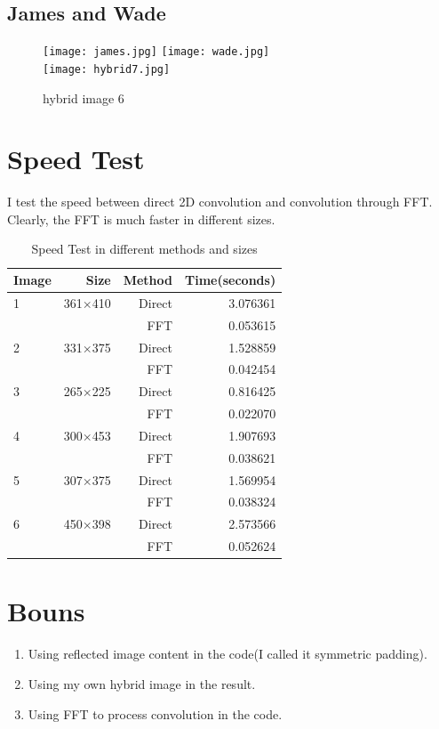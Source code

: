 \subsection{James and Wade}
\begin{figure}[h]
	\texttt{[image: james.jpg]}
	\texttt{[image: wade.jpg]}\\
	\texttt{[image: hybrid7.jpg]}
	\caption{hybrid image 6}
\end{figure}
\newpage
\section{Speed Test}
I test the speed between direct 2D convolution and convolution through FFT. Clearly, the FFT is much faster in different sizes.
\begin{table}[h]
    \centering
    \begin{tabular}{lrrr}
       	\hline
        Image 	&Size 	&Method &Time(seconds) \\
        \hline
        1 		& 361$\times$410 	&Direct	&3.076361\\
         		&  &FFT	&0.053615\\
       	\hline
       	2 		& 331$\times$375 	&Direct	&1.528859\\
       	&  &FFT	&0.042454\\
       	\hline
       	3 		& 265$\times$225 	&Direct	&0.816425\\
       	&  &FFT	&0.022070\\
       	\hline
       	4 		& 300$\times$453 	&Direct	&1.907693\\
       	&  &FFT	&0.038621\\
       	\hline
       	5 		& 307$\times$375 	&Direct	&1.569954\\
       	&  &FFT	&0.038324\\
       	\hline
       	6 		& 450$\times$398 	&Direct	&2.573566\\
       	&  &FFT	&0.052624\\
       	\hline
    \end{tabular}
    \caption{Speed Test in different methods and sizes}
\end{table}
\section{Bouns}
	\begin{enumerate}
		\item Using reflected image content in the code(I called it symmetric padding).
		\item Using my own hybrid image in the result.
		\item Using FFT to process convolution in the code.
	\end{enumerate}
